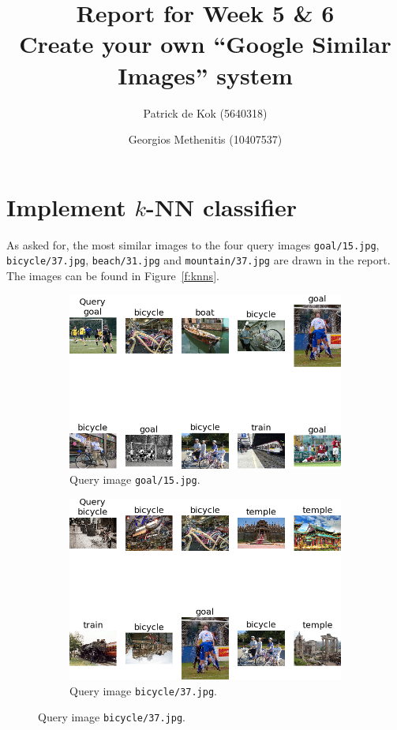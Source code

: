 \documentclass[a4paper,10pt,twoside]{article}
\title{Report for Week 5 \& 6\\\normalsize Create your own ``Google Similar Images'' system}
\author{Patrick de Kok (5640318) \and Georgios Methenitis (10407537)}
\begin{document}
\maketitle
\thispagestyle{empty}

\section{Implement $k$-NN classifier}
As asked for, the most similar images to the four query images \texttt{goal/15.jpg}, \texttt{bicycle/37.jpg}, \texttt{beach/31.jpg} and \texttt{mountain/37.jpg} are drawn in the report.  The images can be found in Figure~\ref{f:knns}.

\begin{figure}
  \begin{subfigure}{.47\textwidth}
    \centering
    \includegraphics[width=1\textwidth]{knn_goal15}
    \caption{Query image \texttt{goal/15.jpg}.}
  \end{subfigure}
  \hspace*{\fill}
  \begin{subfigure}{.47\textwidth}
    \centering
    \includegraphics[width=1\textwidth]{knn_bicycle37}
    \caption{Query image \texttt{bicycle/37.jpg}.}
  \end{subfigure}


\end{figure}
\end{document}
